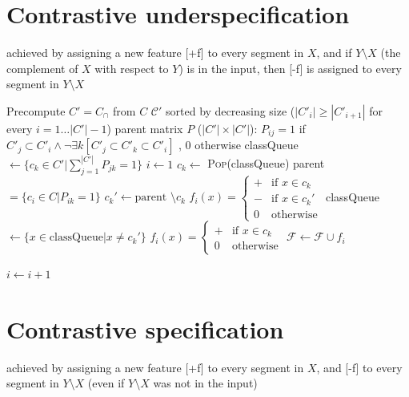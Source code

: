 \documentclass[11pt, oneside]{article}   	%
\begin{document}
\section{Contrastive underspecification}
achieved by assigning a new feature [+f] to every segment in $X$, and if $Y \setminus X$ (the complement of $X$ with respect to $Y$) is in the input, then [-f] is assigned to every segment in $Y \setminus X$


\vspace{\baselineskip} \noindent \begin{algorithmic}
	\REQUIRE Precompute $C' = C_\cap$ from $C$
	\REQUIRE $\mathcal C'$ sorted by decreasing size ($|C'_i| \geq |C'_{i+1}| $ for every $i = 1 \ldots |C'|-1$)
	\REQUIRE parent matrix $P$ ($|C'| \times |C'|$): $P_{ij} = 1$ if $C'_j \subset C'_i \land \neg \exists k [C'_j \subset C'_k \subset C'_i]$ , $0$ otherwise
	\STATE
	\STATE classQueue $\leftarrow \{c_k \in C' | \sum_{j=1}^{|C'|}P_{jk} = 1 \}$
	\STATE $i \leftarrow 1$
	\STATE
	\STATE $c_k \leftarrow$ \textsc{Pop}(classQueue)
	\STATE parent $ = \{c_i \in C | P_{ik} = 1\}$
	\STATE $c_k' \leftarrow \mbox{parent } \setminus c_k$
	\STATE $f_i(x) = \begin{cases}
	+ & \mbox{if } x \in c_k \\
	- & \mbox{if } x \in c_k' \\
	0 & \mbox{otherwise}
	\end{cases} $
	\STATE classQueue $\leftarrow \{x \in \mbox{classQueue} | x \not= c_k' \}$
	\ELSE
	\STATE $f_i(x) = \begin{cases}
	+ & \mbox{if } x \in c_k \\
	0 & \mbox{otherwise}
	\end{cases} $
	\ENDIF
	\STATE $\mathcal F \leftarrow \mathcal F \cup f_i$
	
	\STATE $i \leftarrow i + 1$
	\ENDWHILE
\end{algorithmic}

\section{Contrastive specification}
achieved by assigning a new feature [+f] to every segment in $X$, and [-f] to every segment in $Y \setminus X$ (even if $Y \setminus X$ was not in the input)
\end{document}
